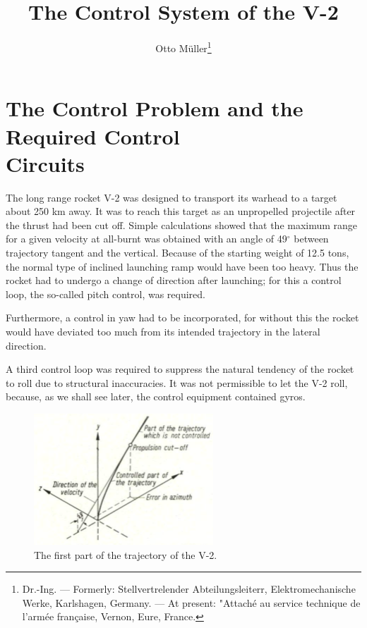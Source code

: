 \documentclass[12pt, a4paper]{article}
\title{The Control System of the V-2}
\author{Otto Müller\footnote{Dr.-Ing. — Formerly: Stellvertrelender Abteilungsleiterr, Elektromechanische Werke, Karlshagen, Germany. — At present: "Attaché au service technique de l'armée française, Vernon, Eure, France.}}
\date{}
\begin{document}
\maketitle
\tableofcontents

\newpage
\section[The Control Problem and the Required Control Circuits]{The Control Problem and the Required Control\\Circuits}

The long range rocket V-2 was designed to transport its warhead to a target about 250 km away. It was to reach this target as an unpropelled projectile after the thrust had been cut off. Simple calculations showed that the maximum range for a given velocity at all-burnt was obtained with an angle of 49$^\circ$ between trajectory tangent and the vertical. Because of the starting weight of 12.5 tons, the normal type of inclined launching ramp would have been too heavy. Thus the rocket had to undergo a change of direction after launching; for this a control loop, the so-called pitch control, was required.

Furthermore, a control in yaw had to be incorporated, for without this the rocket would have deviated too much from its intended trajectory in the lateral direction.

A third control loop was required to suppress the natural tendency of the rocket to roll due to structural inaccuracies. It was not permissible to let the V-2 roll, because, as we shall see later, the control equipment contained gyros.

\begin{figure}[ht]
  \centering
  \includegraphics[width=0.6\textwidth]{figs/ctrl-01.png}
  \caption{The first part of the trajectory of the V-2.}
  \label{fig:01}
\end{figure}
\end{document}
